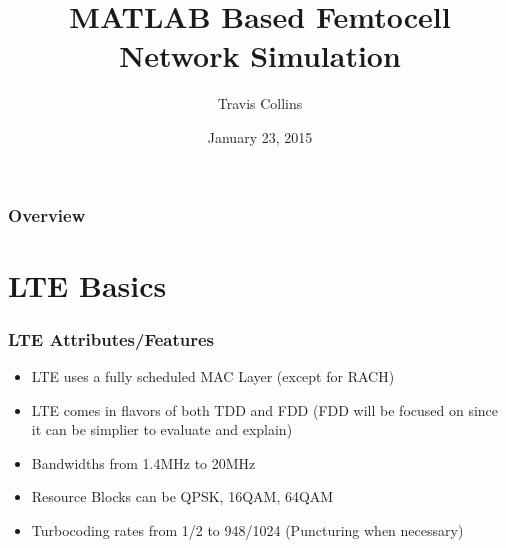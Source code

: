 \documentclass{beamer}
\title[Femtocell Simulations]{MATLAB Based Femtocell Network Simulation} %
\author{Travis Collins} %
\institute[WPI] %
{
Worcester Polyntechnic Institute \\ %
\medskip
\textit{traviscollins@wpi.edu} %
}
\date{January 23, 2015}
\begin{document}
\begin{frame}
\titlepage %
\end{frame}

\begin{frame}
\frametitle{Overview} %
\tableofcontents %
\end{frame}


\section{LTE Basics} %



\begin{frame}
  \frametitle{LTE Attributes/Features}
  \begin{itemize}
    \item LTE uses a fully scheduled MAC Layer (except for RACH)
    \item LTE comes in flavors of both TDD and FDD (FDD will be focused on since it can be simplier to evaluate and explain)
    \item Bandwidths from 1.4MHz to 20MHz
    \item Resource Blocks can be QPSK, 16QAM, 64QAM
    \item Turbocoding rates from 1/2 to 948/1024 (Puncturing when necessary)
  \end{itemize}
\end{frame}
\end{document}
